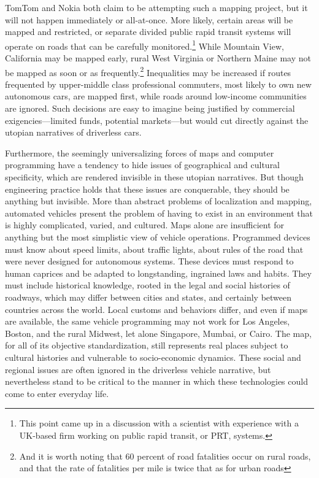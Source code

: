 TomTom \cite{tomtommaps} and Nokia \cite{ubergizmo} both claim to be attempting such
a mapping project,
but it will not happen immediately or all-at-once. More likely,
certain areas will be 
mapped and restricted, or separate divided public rapid transit
systems will operate on roads that can be carefully
monitored.\footnote{This point came up in a discussion with a
  scientist with experience with a UK-based firm working on public
  rapid transit, or PRT, systems.} While
Mountain View, California may be mapped early, rural West Virginia or
Northern Maine may not be mapped as soon or as
frequently.\footnote{And it is worth noting that 60 percent of road
  fatalities occur on rural roads, and that the rate of fatalities per
mile is twice that as for urban roads\cite[p. 11]{broviakCars}}
Inequalities may be increased if routes frequented by upper-middle
class professional commuters, most likely to own new autonomous cars,
are mapped first, while roads around low-income communities are
ignored. Such decisions are easy to imagine being justified by
commercial exigencies---limited funds, potential markets---but would
cut directly against the utopian narratives of driverless cars.

Furthermore, the seemingly universalizing forces of maps and computer programming
have a tendency to hide issues of geographical and cultural
specificity, which are rendered invisible in these utopian narratives.
But though engineering practice holds that these issues are
conquerable, they should be anything but invisible. More than
abstract problems of localization and mapping, automated vehicles
present the problem of having to exist in an environment that is
highly complicated, varied, and cultured. Maps alone are insufficient
for anything but the most simplistic view of vehicle operations.
Programmed devices
must know about speed limits, about traffic
lights, about rules of the road that were never designed for
autonomous systems. These devices must respond to human caprices and
be adapted to longstanding, ingrained laws and habits. They must
include historical knowledge, rooted in the legal and social histories
of roadways, which may differ between cities and states, and certainly
between countries across the world. Local customs and behaviors differ, and even if maps are
available, the same vehicle programming may not work for Los Angeles,
Boston, and the rural Midwest, let alone Singapore, Mumbai, or Cairo.
The map, for all of its objective standardization, still represents
real places subject to cultural histories and vulnerable to
socio-economic dynamics. These social and regional issues are often
ignored in the driverless vehicle narrative, but nevertheless stand to
be critical to the manner in which these technologies could come to
enter everyday life.



